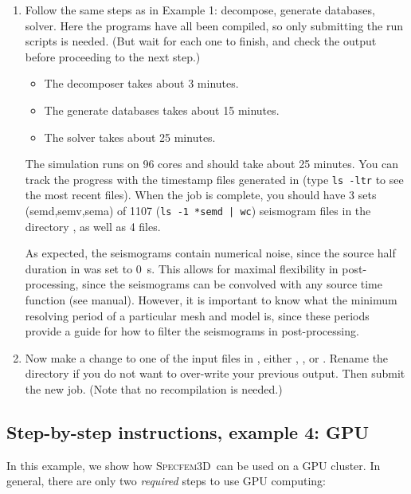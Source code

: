 \documentclass[10pt,fleqn,letterpaper]{article}
\newcommand{\specfem}{\textsc{Specfem3D}}
\begin{document}
\begin{enumerate}
\item Follow the same steps as in Example 1: decompose, generate databases, solver. Here the programs have all been compiled, so only submitting the run scripts is needed. (But wait for each one to finish, and check the output before proceeding to the next step.)
%
\begin{itemize}
\item The decomposer takes about 3 minutes.
\item The generate databases takes about 15 minutes.
\item The solver takes about 25 minutes.
\end{itemize}
%
The simulation runs on 96 cores and should take about 25 minutes. You can track the progress with the timestamp files generated in  (type \lstinline{ls -ltr} to see the most recent files). When the job is complete, you should have 3 sets (semd,semv,sema) of 1107 (\lstinline{ls -1 *semd | wc}) seismogram files in the directory , as well as 4  files.

As expected, the seismograms contain numerical noise, since the source half duration in  was set to 0~s. This allows for maximal flexibility in post-processing, since the seismograms can be convolved with any source time function (see manual). However, it is important to know what the minimum resolving period of a particular mesh and model is, since these periods provide a guide for how to filter the seismograms in post-processing.

\item Now make a change to one of the input files in , either , , or . Rename the  directory if you do not want to over-write your previous output. Then submit the new job. (Note that no recompilation is needed.)

\end{enumerate}


\subsection*{Step-by-step instructions, example 4: GPU}

In this example, we show how \specfem\ can be used on a GPU cluster. In general,
there are only two {\em required} steps to use GPU computing:
\end{document}
